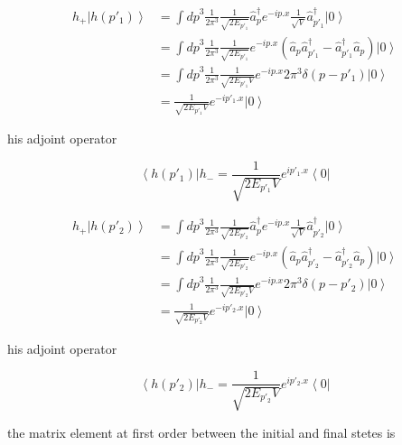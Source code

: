 \begin{equation}
  \begin{split}
    h_+ \left| h(p'_1) \right \rangle & = \int{ {dp}^3 \frac{1}{2\pi^3} \frac{1}{\sqrt{2E_{p'_1}}} \hat{a}_p^\dagger e^{-ip.x} \frac{1}{\sqrt{V}} \hat{a}_{p'_1}^\dagger \left | 0 \right \rangle}\\
    &=\int {{dp}^3 \frac{1}{2\pi^3} \frac{1}{\sqrt{2E_{p'_1}}} e^{-ip.x} (\hat{a}_p \hat{a}_{p'_1}^\dagger - \hat{a}_{p'_1}^\dagger \hat{a}_p)\left | 0 \right \rangle }\\
    &=\int {{dp}^3 \frac{1}{2\pi^3} \frac{1}{\sqrt{2E_{p'_1}V}} e^{-ip.x} 2\pi^3 \delta(p-p'_1) \left | 0 \right \rangle }\\
    &= \frac{1}{\sqrt{2E_{p'_1}V}} e^{-ip'_1.x} \left | 0 \right \rangle
  \end{split}
\end{equation}

his adjoint operator

\begin{equation}
  \left \langle h(p'_1) \right | h_- = \frac{1}{\sqrt{2E_{p'_1}V}} e^{ip'_1.x} \left \langle 0 \right |
\end{equation}

\begin{equation}
  \begin{split}
    h_+ \left| h(p'_2) \right \rangle & = \int{ {dp}^3 \frac{1}{2\pi^3} \frac{1}{\sqrt{2E_{p'_2}}} \hat{a}_p^\dagger e^{-ip.x} \frac{1}{\sqrt{V}} \hat{a}_{p'_2}^\dagger \left | 0 \right \rangle}\\
    &=\int {{dp}^3 \frac{1}{2\pi^3} \frac{1}{\sqrt{2E_{p'_2}}} e^{-ip.x} (\hat{a}_p \hat{a}_{p'_2}^\dagger - \hat{a}_{p'_2}^\dagger \hat{a}_p)\left | 0 \right \rangle }\\
    &=\int {{dp}^3 \frac{1}{2\pi^3} \frac{1}{\sqrt{2E_{p'_2}V}} e^{-ip.x} 2\pi^3 \delta(p-p'_2) \left | 0 \right \rangle }\\
    &= \frac{1}{\sqrt{2E_{p'_2}V}} e^{-ip'_2.x} \left | 0 \right \rangle
  \end{split}
\end{equation}

his adjoint operator

\begin{equation}
  \left \langle h(p'_2) \right | h_- = \frac{1}{\sqrt{2E_{p'_2}V}} e^{ip'_2.x} \left \langle 0 \right |
\end{equation}

the matrix element at first order between the initial and final stetes is 

